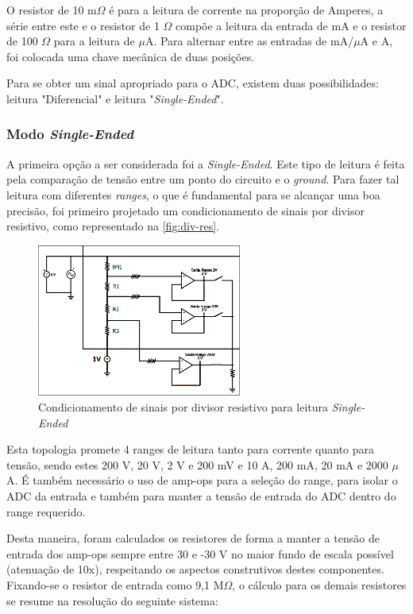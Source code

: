 O resistor de 10 m$\Omega$ é para a leitura de corrente na proporção de Amperes, a série entre este e o resistor de 1 $\Omega$ compõe a leitura da entrada de mA e o resistor de 100 $\Omega$ para a leitura de $\mu$A. Para alternar entre as entradas de mA/$\mu$A e A, foi colocada uma chave mecânica de duas posições.

Para se obter um sinal apropriado para o ADC, existem duas possibilidades: leitura "Diferencial" e leitura "\textit{Single-Ended}".

\subsubsection{Modo \textit{Single-Ended}}\label{single-ended}

A primeira opção a ser considerada foi a \textit{Single-Ended}. Este tipo de leitura é feita pela comparação de tensão entre um ponto do circuito e o \textit{ground}. Para fazer tal leitura com diferentes \textit{ranges}, o que é fundamental para se alcançar uma boa precisão, foi primeiro projetado um condicionamento de sinais por divisor resistivo, como representado na \autoref{fig:div-res}.

\begin{figure}[htb!]
    \caption{Condicionamento de sinais por divisor resistivo para leitura \textit{Single-Ended}}
    \label{fig:div-res}
    \includegraphics[width=0.6\textwidth]{figuras/div-res.png}
    \fonte{}
\end{figure}

Esta topologia promete 4 ranges de leitura tanto para corrente quanto para tensão, sendo estes 200 V, 20 V, 2 V e 200 mV e 10 A, 200 mA, 20 mA e 2000 $\mu$A. É também necessário o uso de \gls{amp-op}s para a seleção do range, para isolar o \gls{ADC} da entrada e também para manter a tensão de entrada do \gls{ADC} dentro do range requerido.

Desta maneira, foram calculados os resistores de forma a manter a tensão de entrada dos \gls{amp-op}s sempre entre 30 e -30 V no maior fundo de escala possível (atenuação de 10x), respeitando os aspectos construtivos destes componentes. Fixando-se o resistor de entrada como 9,1 M$\Omega$, o cálculo para os demais resistores se resume na resolução do seguinte sistema:

